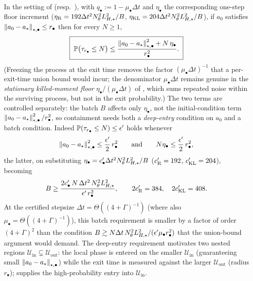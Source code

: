 \begin{proposition}
\label{prop:finite-horizon}
In the setting of  (resp.\ ), with
$q_\bullet:=1-\mu_\bullet\Delta t$ and $\eta_\bullet$ the corresponding one-step floor increment
($\eta_{\mathrm{R}}=192\Delta t^2N_\theta^2L_{H,\star}^2/B$, $\eta_{\mathrm{KL}}=204\Delta t^2N_\theta^2L_{H,\star}^2/B$), if
$a_0$ satisfies $\left\lVert a_0-a_\star\right\rVert_{\star,\bullet}\leq r_\bullet$ then for every $N\geq1$,
\[
    \boxed{\;
    \mathbb{P}\bigl(\tau_{r_\bullet}\leq N\bigr)
    \leq\frac{\left\lVert a_0-a_\star\right\rVert_{\star,\bullet}^2+N\,\eta_\bullet}{r_\bullet^2}.
    \;}
\]
(Freezing the process at the exit time removes the factor $(\mu_\bullet\Delta t)^{-1}$ that a
per-exit-time union bound would incur; the denominator $\mu_\bullet\Delta t$ remains genuine in the
\emph{stationary killed-moment floor} $\eta_\bullet/(\mu_\bullet\Delta t)$ of
, which sums repeated noise within the surviving
process, but not in the exit probability.) The two terms are controlled separately: the batch $B$
affects only $\eta_\bullet$, not the initial-condition term
$\left\lVert a_0-a_\star\right\rVert_{\star,\bullet}^2/r_\bullet^2$, so containment needs both a \emph{deep-entry}
condition on $a_0$ and a batch condition. Indeed
$\mathbb{P}(\tau_{r_\bullet}\leq N)\leq\epsilon'$ holds whenever
\[
    \left\lVert a_0-a_\star\right\rVert_{\star,\bullet}^2\leq\frac{\epsilon'}2\,r_\bullet^2
    \qquad\text{and}\qquad
    N\eta_\bullet\leq\frac{\epsilon'}2\,r_\bullet^2,
\]
the latter, on substituting $\eta_\bullet=c'_\bullet\Delta t^2N_\theta^2L_{H,\star}^2/B$ ($c'_{\mathrm{R}}=192$,
$c'_{\mathrm{KL}}=204$), becoming
\[
    B\geq\frac{2c'_\bullet\,N\,\Delta t^2\,N_\theta^2L_{H,\star}^2}{\epsilon'\,r_\bullet^2},
    \qquad 2c'_{\mathrm{R}}=384,\quad 2c'_{\mathrm{KL}}=408.
\]
At the certified stepsize $\Delta t=\Theta((4+\Gamma)^{-1})$ (where also
$\mu_\bullet=\Theta((4+\Gamma)^{-1})$), this batch requirement is smaller by a factor of order
$(4+\Gamma)^2$ than the condition $B\gtrsim N\Delta t\,N_\theta^2L_{H,\star}^2/(\epsilon'\mu_\bullet
r_\bullet^2)$ that the union-bound argument would demand. The deep-entry requirement motivates two
nested regions $\mathcal U_{\mathrm{in}}\subsetneq\mathcal U_{\mathrm{out}}$: the local phase is
entered on the smaller $\mathcal U_{\mathrm{in}}$ (guaranteeing small
$\left\lVert a_0-a_\star\right\rVert_{\star,\bullet}$) while the exit time is measured against the larger
$\mathcal U_{\mathrm{out}}$ (radius $r_\bullet$);  supplies the
high-probability entry into $\mathcal U_{\mathrm{in}}$.
\end{proposition}

